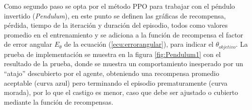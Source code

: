 Como segundo paso se opta por el método PPO para trabajar con el péndulo invertido (\textit{Pendulum}), en este punto se definen las gráficas de recompensa, pérdida, tiempo de la iteración y duración del episodio, todos como valores promedio en el entrenamiento y se adiciona a la función de recompensa el factor de error angular $E_{\theta}$ de la ecuación (\ref{ecu:errorangular}), para indicar el $\theta_{objetivo}$. La prueba de implementación se muestra en la figura \ref{fig:Pendulum1} con el resultado de la prueba, donde se muestra un comportamiento inesperado por un ``atajo'' descubierto por el agente, obteniendo una recompensa promedio aceptable (curva azul) pero terminando el episodio prematuramente (curva morada), por lo que el castigo es menor, caso que debe ser ajustado o cubierto mediante la función de recompensas.



